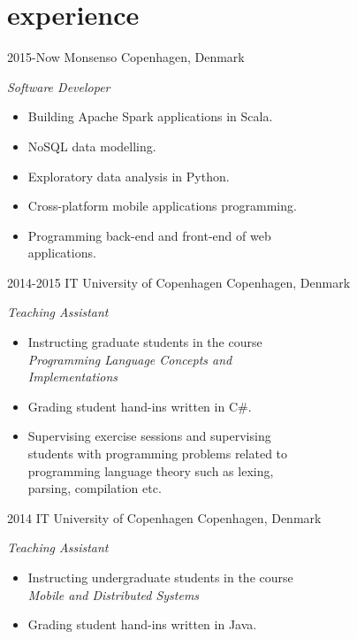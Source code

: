 \documentclass[]{friggeri-cv} %
\begin{document}

\section{experience}

\begin{entrylist}
\entry
{2015-Now}
{Monsenso}
{Copenhagen, Denmark}
{\emph{Software Developer}
\begin{itemize}
	\item Building Apache Spark applications in Scala.
	\item NoSQL data modelling.
	\item Exploratory data analysis in Python.
	\item Cross-platform mobile applications programming.
	\item Programming back-end and front-end of web\\applications.
\end{itemize}}
\entry
{2014-2015}
{IT University of Copenhagen}
{Copenhagen, Denmark}
{\emph{Teaching Assistant}
\begin{itemize}
	\item Instructing graduate students in the course \\\emph{Programming Language Concepts and\\Implementations}
	\item Grading student hand-ins written in C\#.
	\item Supervising exercise sessions and supervising\\students with programming problems related to\\programming language theory such as lexing,\\parsing, compilation etc.
\end{itemize}}
\entry
{2014}
{IT University of Copenhagen}
{Copenhagen, Denmark}
{\emph{Teaching Assistant}
\begin{itemize}
	\item Instructing undergraduate students in the course \\\emph{Mobile and Distributed Systems}
	\item Grading student hand-ins written in Java.

\end{itemize}}
\end{entrylist}
\end{document}
